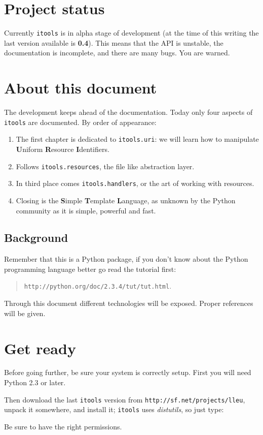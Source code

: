\section{Project status}

Currently {\tt itools} is in alpha stage of development (at the time of
this writing the last version available is {\bf 0.4}). This means that the
API is unstable, the documentation is incomplete, and there are many bugs.
You are warned.

\section{About this document}

The development keeps ahead of the documentation. Today only four aspects
of {\tt itools} are documented. By order of appearance:

\begin{enumerate}
  \item The first chapter is dedicated to {\tt itools.uri}: we will learn how
    to manipulate {\bf U}niform {\bf R}esource {\bf I}dentifiers.

  \item Follows {\tt itools.resources}, the file like abstraction layer.

  \item In third place comes {\tt itools.handlers}, or the art of working
    with resources.

  \item Closing is the {\bf S}imple {\bf T}emplate {\bf L}anguage, as unknown
    by the Python community as it is simple, powerful and fast.
\end{enumerate}


\subsection{Background}

Remember that this is a Python package, if you don't know about the Python
programming language better go read the tutorial first:

\begin{quote}
  {\tt http://python.org/doc/2.3.4/tut/tut.html}.
\end{quote}

Through this document different technologies will be exposed. Proper
references will be given.

\section{Get ready}

Before going further, be sure your system is correctly setup. First you
will need Python 2.3 or later.

Then download the last {\tt itools} version from
{\tt http://sf.net/projects/lleu}, unpack it somewhere, and install it;
{\tt itools} uses {\em distutils}, so just type:


Be sure to have the right permissions.


